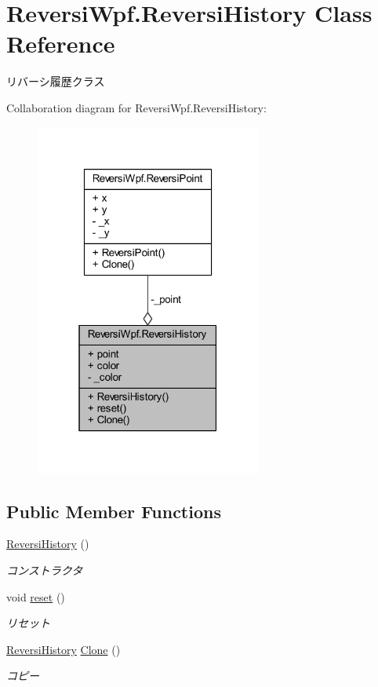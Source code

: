 \hypertarget{class_reversi_wpf_1_1_reversi_history}{}\section{Reversi\+Wpf.\+Reversi\+History Class Reference}
\label{class_reversi_wpf_1_1_reversi_history}


リバーシ履歴クラス  




Collaboration diagram for Reversi\+Wpf.\+Reversi\+History\+:
\nopagebreak
\begin{figure}[H]
\begin{center}
\leavevmode
\includegraphics[width=211pt]{class_reversi_wpf_1_1_reversi_history__coll__graph}
\end{center}
\end{figure}
\subsection*{Public Member Functions}
\begin{DoxyCompactItemize}
\item 
\hyperlink{class_reversi_wpf_1_1_reversi_history_a25e64abaf19f7265921c21940c875d31}{Reversi\+History} ()
\begin{DoxyCompactList}\small\item\em コンストラクタ \end{DoxyCompactList}\item 
void \hyperlink{class_reversi_wpf_1_1_reversi_history_a2a57686bf23df7dcfa8ee9cd8cdc7fdb}{reset} ()
\begin{DoxyCompactList}\small\item\em リセット \end{DoxyCompactList}\item 
\hyperlink{class_reversi_wpf_1_1_reversi_history}{Reversi\+History} \hyperlink{class_reversi_wpf_1_1_reversi_history_a3f8fa9ca02b1fdb6068e9ae3ebdc80f8}{Clone} ()
\begin{DoxyCompactList}\small\item\em コピー \end{DoxyCompactList}\end{DoxyCompactItemize}
